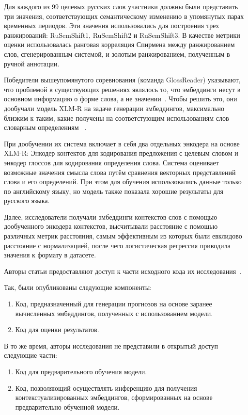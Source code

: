 \documentclass[LI,VKR]{HSEUniversity}
\begin{document}
Для каждого из 99 целевых русских слов участники должны
были представить три значения, соответствующих семантическому изменению в упомянутых парах
временных периодов.
Эти значения использовались для построения трех ранжирований:
RuSemShift1, RuSemShift2 и RuSemShift3.
В качестве метрики оценки использовалась ранговая корреляция Спирмена между ранжированием слов,
сгенерированным системой, и золотым ранжированием, полученным в ручной аннотации.

Победители вышеупомянутого соревнования (команда GlossReader) указывают,
что проблемой в существующих решениях являлось то,
что эмбеддинги несут в основном информацию о форме слова, а не значении~\cite{GlossReader}.
Чтобы решить это, они дообучали модель XLM-R на задаче генерации эмбеддингов, максимально близким
к таким, какие получены на соответстующим использованиям слов словарным определениям
~\cite{XLM-R}.

При дообучении их система включает в себя два отдельных энкодера на основе XLM-R:
Энкодер контектов для кодирования предложения с целевым словом и
энкодер глоссов для кодирования определения слова.
Система оценивает возможные значения смысла слова путём сравнения векторных представлений слова
и его определений.
При этом для обучения использовались данные только по английскому языку,
но модель также показала хорошие результаты для русского языка.

Далее, исследователи получали эмбеддинги контекстов слов с помощью
дообученного энкодера контекстов, высчитывали расстояние с помощью различных метрик расстояния,
самым эффективным из которых были евклидово расстояние с нормализацией, после чего
логистическая регрессия приводила значения к формату в датасете.

Авторы статьи предоставляют доступ к части исходного кода их исследования~\cite{GlossReaderGitHub}.

Так, были опубликованы следующие компоненты:
\begin{enumerate}
    \item Код, предназначенный для генерации прогнозов на основе заранее вычисленных эмбеддингов,
полученных с использованием модели.
    \item Код для оценки результатов.
\end{enumerate}

В то же время, авторы исследования не представили в открытый доступ следующие части:
\begin{enumerate}
    \item Код для предварительного обучения модели.
    \item Код, позволяющий осуществлять инференцию для получения контекстуализированных
    эмбеддингов, сформированных на основе предварительно обученной модели.
\end{enumerate}
\end{document}
